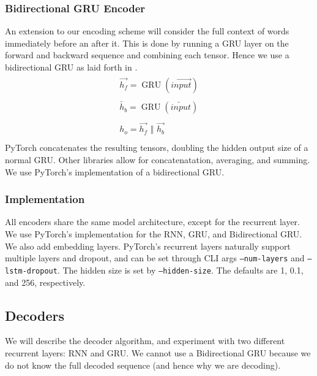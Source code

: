 \documentclass[twoside,twocolumn]{article}
\begin{document}
\subsubsection{Bidirectional GRU Encoder}
An extension to our encoding scheme will consider the full context of words
immediately before an after it. This is done by running a GRU layer on the
forward and backward sequence and combining each tensor. Hence we use a
bidirectional GRU as laid forth in \cite{bahdanau2014neural}.
\begin{equation}
  \label{eq:bidirectional}
  \begin{split}
    \begin{array}{ll}
      \overrightarrow{h_f} = \operatorname{GRU}(\overrightarrow{input})\\
      \\
      \overleftarrow{h_b} = \operatorname{GRU}(\overleftarrow{input})\\
      \\
      h_o = \overrightarrow{h_f} \,\,\Vert \,\, \overrightarrow{h_b}\\
    \end{array}
  \end{split}
\end{equation}
PyTorch concatenates the resulting tensors, doubling the hidden output size
of a normal GRU. Other libraries allow for concatenatation, averaging,
and summing. We use PyTorch's implementation of a bidirectional GRU.

\subsubsection{Implementation}
All encoders share the same model architecture, except for the recurrent layer.
We use PyTorch's implementation for the RNN, GRU, and Bidirectional GRU.
We also add embedding layers. PyTorch's recurrent layers naturally support
multiple layers and dropout, and can be set through CLI args
\texttt{--num-layers} and \texttt{--lstm-dropout}. The hidden size is set by
\texttt{--hidden-size}. The defaults are 1, 0.1, and 256, respectively.


\subsection{Decoders}
We will describe the decoder algorithm, and experiment with two different
recurrent layers: RNN and GRU. We cannot use a Bidirectional GRU because
we do not know the full decoded sequence (and hence why we are decoding).
\end{document}
